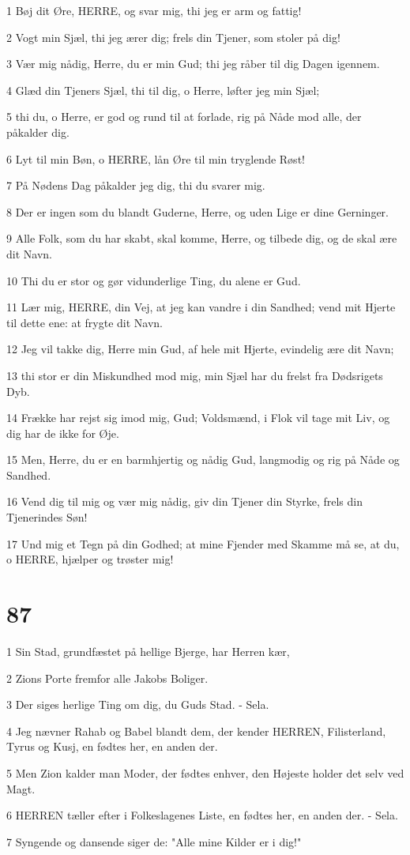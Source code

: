 \par 1 Bøj dit Øre, HERRE, og svar mig, thi jeg er arm og fattig!
\par 2 Vogt min Sjæl, thi jeg ærer dig; frels din Tjener, som stoler på dig!
\par 3 Vær mig nådig, Herre, du er min Gud; thi jeg råber til dig Dagen igennem.
\par 4 Glæd din Tjeners Sjæl, thi til dig, o Herre, løfter jeg min Sjæl;
\par 5 thi du, o Herre, er god og rund til at forlade, rig på Nåde mod alle, der påkalder dig.
\par 6 Lyt til min Bøn, o HERRE, lån Øre til min tryglende Røst!
\par 7 På Nødens Dag påkalder jeg dig, thi du svarer mig.
\par 8 Der er ingen som du blandt Guderne, Herre, og uden Lige er dine Gerninger.
\par 9 Alle Folk, som du har skabt, skal komme, Herre, og tilbede dig, og de skal ære dit Navn.
\par 10 Thi du er stor og gør vidunderlige Ting, du alene er Gud.
\par 11 Lær mig, HERRE, din Vej, at jeg kan vandre i din Sandhed; vend mit Hjerte til dette ene: at frygte dit Navn.
\par 12 Jeg vil takke dig, Herre min Gud, af hele mit Hjerte, evindelig ære dit Navn;
\par 13 thi stor er din Miskundhed mod mig, min Sjæl har du frelst fra Dødsrigets Dyb.
\par 14 Frække har rejst sig imod mig, Gud; Voldsmænd, i Flok vil tage mit Liv, og dig har de ikke for Øje.
\par 15 Men, Herre, du er en barmhjertig og nådig Gud, langmodig og rig på Nåde og Sandhed.
\par 16 Vend dig til mig og vær mig nådig, giv din Tjener din Styrke, frels din Tjenerindes Søn!
\par 17 Und mig et Tegn på din Godhed; at mine Fjender med Skamme må se, at du, o HERRE, hjælper og trøster mig!

\chapter{87}

\par 1 Sin Stad, grundfæstet på hellige Bjerge, har Herren kær,
\par 2 Zions Porte fremfor alle Jakobs Boliger.
\par 3 Der siges herlige Ting om dig, du Guds Stad. - Sela.
\par 4 Jeg nævner Rahab og Babel blandt dem, der kender HERREN, Filisterland, Tyrus og Kusj, en fødtes her, en anden der.
\par 5 Men Zion kalder man Moder, der fødtes enhver, den Højeste holder det selv ved Magt.
\par 6 HERREN tæller efter i Folkeslagenes Liste, en fødtes her, en anden der. - Sela.
\par 7 Syngende og dansende siger de: "Alle mine Kilder er i dig!"

